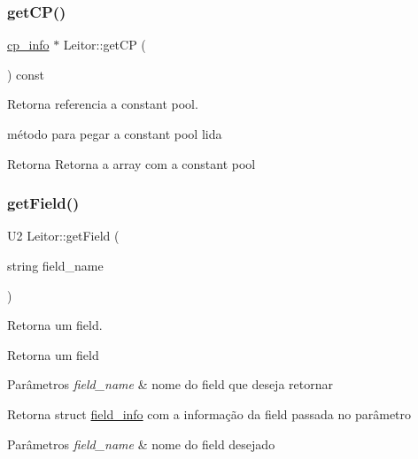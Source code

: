 \subsubsection{\texorpdfstring{get\+C\+P()}{getCP()}}
{\footnotesize\ttfamily \hyperlink{structcp__info}{cp\+\_\+info} $\ast$ Leitor\+::get\+CP (\begin{DoxyParamCaption}{ }\end{DoxyParamCaption}) const}



Retorna referencia a constant pool. 

método para pegar a constant pool lida \begin{DoxyReturn}{Retorna}
Retorna a array com a constant pool 
\end{DoxyReturn}
\mbox{\label{classLeitor_a1c0eb678858e00efa9c18d63832d3dff}} 
\subsubsection{\texorpdfstring{get\+Field()}{getField()}}
{\footnotesize\ttfamily U2 Leitor\+::get\+Field (\begin{DoxyParamCaption}\item[{string}]{field\+\_\+name }\end{DoxyParamCaption})}



Retorna um field. 

Retorna um field 
\begin{DoxyParams}{Parâmetros}
{\em field\+\_\+name} & nome do field que deseja retornar \\
\hline
\end{DoxyParams}
\begin{DoxyReturn}{Retorna}
struct \hyperlink{structfield__info}{field\+\_\+info} com a informação da field passada no parâmetro
\end{DoxyReturn}

\begin{DoxyParams}{Parâmetros}
{\em field\+\_\+name} & nome do field desejado \\
\hline
\end{DoxyParams}
\mbox{\label{classLeitor_a32f5a9515e24523f3f4016141de5cc9d}} 
